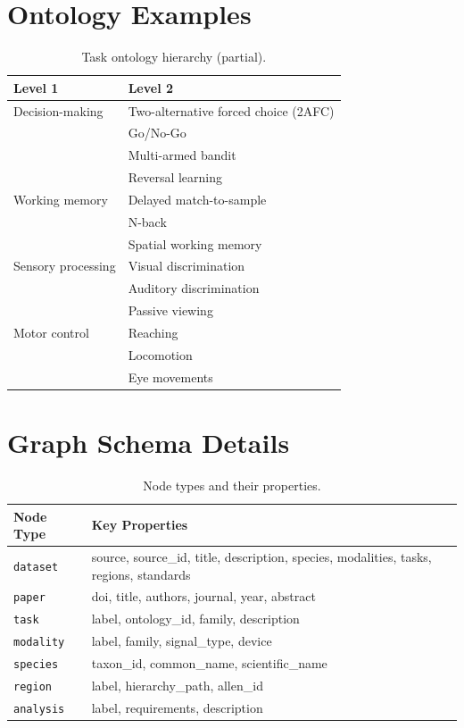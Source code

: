 \documentclass{article}
\theoremstyle{definition}
\begin{document}
\section{Ontology Examples}
\label{app:ontology}

\begin{table}[H]
\centering
\small
\caption{Task ontology hierarchy (partial).}
\begin{tabular}{ll}
\toprule
Level 1 & Level 2 \\
\midrule
Decision-making & Two-alternative forced choice (2AFC) \\
& Go/No-Go \\
& Multi-armed bandit \\
& Reversal learning \\
\midrule
Working memory & Delayed match-to-sample \\
& N-back \\
& Spatial working memory \\
\midrule
Sensory processing & Visual discrimination \\
& Auditory discrimination \\
& Passive viewing \\
\midrule
Motor control & Reaching \\
& Locomotion \\
& Eye movements \\
\bottomrule
\end{tabular}
\end{table}

\section{Graph Schema Details}
\label{app:graph-schema}

\begin{table}[H]
\centering
\small
\caption{Node types and their properties.}
\begin{tabular}{lp{6cm}}
\toprule
Node Type & Key Properties \\
\midrule
\texttt{dataset} & source, source\_id, title, description, species, modalities, tasks, regions, standards \\
\texttt{paper} & doi, title, authors, journal, year, abstract \\
\texttt{task} & label, ontology\_id, family, description \\
\texttt{modality} & label, family, signal\_type, device \\
\texttt{species} & taxon\_id, common\_name, scientific\_name \\
\texttt{region} & label, hierarchy\_path, allen\_id \\
\texttt{analysis} & label, requirements, description \\
\bottomrule
\end{tabular}
\end{table}
\end{document}
